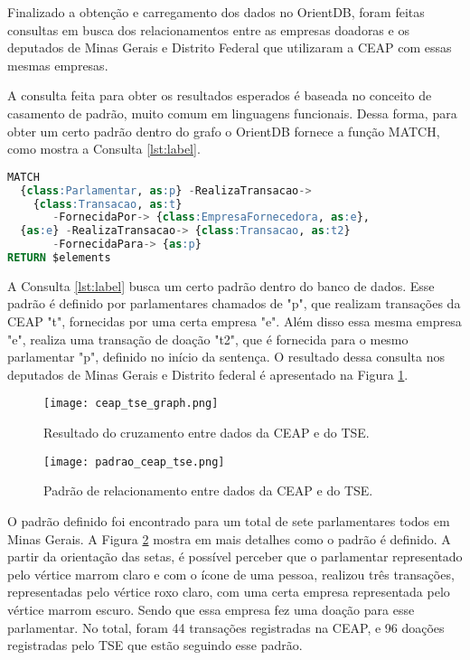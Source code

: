 Finalizado a obtenção e carregamento dos dados no OrientDB, foram feitas consultas em busca dos relacionamentos entre as empresas doadoras e os deputados de Minas Gerais e Distrito Federal que utilizaram a CEAP com essas mesmas empresas.
	
	A consulta feita para obter os resultados esperados é baseada no conceito de casamento de padrão, muito comum em linguagens funcionais. Dessa forma, para obter um certo padrão dentro do grafo o OrientDB fornece a função MATCH, como mostra a Consulta \ref{lst:label}.

\begin{lstlisting}[label={lst:label}, caption={Consulta de relacionamento de doações entre deputados e empresas.},captionpos=b, language=sql]
MATCH 
  {class:Parlamentar, as:p} -RealizaTransacao-> 
  	{class:Transacao, as:t} 
       -FornecidaPor-> {class:EmpresaFornecedora, as:e},
  {as:e} -RealizaTransacao-> {class:Transacao, as:t2} 
  	   -FornecidaPara-> {as:p}
RETURN $elements
\end{lstlisting}

A Consulta \ref{lst:label} busca um certo padrão dentro do banco de dados. Esse padrão é definido por parlamentares chamados de "p", que realizam transações da CEAP "t", fornecidas por uma certa empresa "e". Além disso essa mesma empresa "e", realiza uma transação de doação "t2", que é fornecida para o mesmo parlamentar "p", definido no início da sentença. O resultado dessa consulta nos deputados de Minas Gerais e Distrito federal é apresentado na Figura \ref{fig:ceap_tse_graph}.

\begin{figure}[H]
\centering
\texttt{[image: ceap\_tse\_graph.png]}
\caption{Resultado do cruzamento entre dados da CEAP e do TSE.}
\label{fig:ceap_tse_graph}
\end{figure}

\begin{figure}[H]
\centering
\texttt{[image: padrao\_ceap\_tse.png]}
\caption{Padrão de relacionamento entre dados da CEAP e do TSE.}
\label{fig:padrao_ceap_tse}
\end{figure}

O padrão definido foi encontrado para um total de sete parlamentares todos em Minas Gerais. A Figura \ref{fig:padrao_ceap_tse} mostra em mais detalhes como o padrão é definido. A partir da orientação das setas, é possível perceber que o parlamentar representado pelo vértice marrom claro e com o ícone de uma pessoa, realizou três transações, representadas pelo vértice roxo claro, com uma certa empresa representada pelo vértice marrom escuro. Sendo que essa empresa fez uma doação para esse parlamentar. No total, foram 44 transações registradas na CEAP, e 96 doações registradas pelo TSE que estão seguindo esse padrão.

